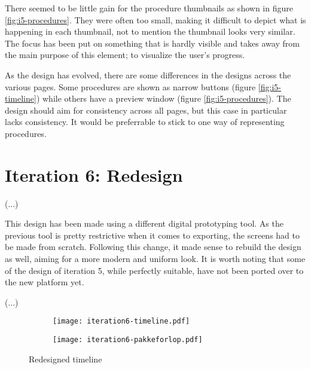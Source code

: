 There seemed to be little gain for the procedure thumbnails as shown in figure \ref{fig:i5-procedures}. They were often too small, making it difficult to depict what is happening in each thumbnail, not to mention the thumbnail looks very similar. The focus has been put on something that is hardly visible and takes away from the main purpose of this element; to visualize the user's progress.

As the design has evolved, there are some differences in the designs across the various pages. Some procedures are shown as narrow buttons (figure \ref{fig:i5-timeline}) while others have a preview window (figure \ref{fig:i5-procedures}). The design should aim for consistency across all pages, but this case in particular lacks consistency. It would be preferrable to stick to one way of representing procedures.

\section{Iteration 6: Redesign}
\label{sec:iteration6}

(...)

This design has been made using a different digital prototyping tool. As the previous tool is pretty restrictive when it comes to exporting, the screens had to be made from scratch. Following this change, it made sense to rebuild the design as well, aiming for a more modern and uniform look. It is worth noting that some of the design of iteration 5, while perfectly suitable, have not been ported over to the new platform yet.

(...)

\begin{figure}
    \centering
    \begin{subfigure}[t]{0.45\textwidth}
        \centering
        \vspace{0pt}
        \texttt{[image: iteration6-timeline.pdf]}
        \label{fig:i6-timeline-zoomin}
    \end{subfigure}
    \begin{subfigure}[t]{0.45\textwidth}
        \centering
        \vspace{0pt}
        \texttt{[image: iteration6-pakkeforlop.pdf]}
        \label{fig:i6-timeline-zoomout}
    \end{subfigure}
    \caption{Redesigned timeline}
    \label{fig:i6-timeline}
\end{figure}

